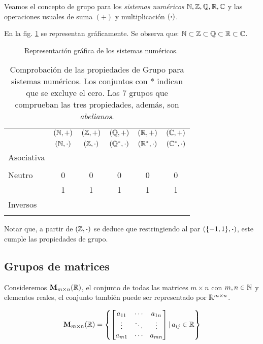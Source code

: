 Veamos el concepto de grupo para los \textit{sistemas numéricos} $\mathbb{N}, \mathbb{Z}, \mathbb{Q}, \mathbb{R}, \mathbb{C}$ y las operaciones usuales de suma $(+)$ y multiplicación $(\boldsymbol{\cdot})$.

En la fig. \ref{fig:sisnum} se representan gráficamente. Se observa que: $\mathbb{N} \subset \mathbb{Z} \subset \mathbb{Q} \subset \mathbb{R} \subset \mathbb{C}$.

\begin{figure}[h]
	\centering
	
	\caption{Representación gráfica de los sistemas numéricos.}
	\label{fig:sisnum}
\end{figure}

\begin{table}[h]
	\centering
	\begin{tabular}{|l|c|c|c|c|c|}
		\hline
		& $(\mathbb{N}, +)$ & $(\mathbb{Z}, +)$ & $(\mathbb{Q}, +)$ & $(\mathbb{R}, +)$ & $(\mathbb{C}, +)$ \\
		& $(\mathbb{N}, \cdot)$ & $(\mathbb{Z}, \cdot)$ & $(\mathbb{Q}^{*}, \cdot)$ & $(\mathbb{R}^{*}, \cdot)$ & $(\mathbb{C}^{*}, \cdot)$ \\ \hline
		Asociativa & \cmark & \cmark & \cmark  & \cmark &  \cmark \\
		& \cmark & \cmark & \cmark  & \cmark  &  \cmark \\ \hline
		Neutro & 0 & 0 & 0  & 0 & 0 \\
		& 1 & 1 & 1  & 1  &  1 \\ \hline
		Inversos & \xmark & \cmark & \cmark  & \cmark & \cmark \\
		& \xmark & \xmark & \cmark  & \cmark & \cmark \\ \hline
	\end{tabular}
	\caption{Comprobación de las propiedades de Grupo para sistemas numéricos. Los conjuntos con $*$ indican que se excluye el cero. Los 7 grupos que comprueban las tres propiedades, además, son \textit{abelianos}.}
\end{table}
Notar que, a partir de $(\mathbb{Z}, \boldsymbol{\cdot})$ se deduce que restringiendo al par $\left(\{ -1, 1 \}, \boldsymbol{\cdot} \right)$, este cumple las propiedades de grupo.


\subsection{Grupos de matrices} \label{sec:matrices}
Consideremos $\mathbf{M}_{m\times n}(\mathbb{R})$, el conjunto de todas las matrices $m \times n$ con $m, n \in \mathbb{N}$ y elementos reales, el conjunto también puede ser representado por $\mathbb{R}^{m \times n}$.

\begin{equation}
	\mathbf{M}_{m \times n}(\mathbb{R}) = \left\{ \begin{bmatrix}
		a_{11} & \cdots & a_{1n}\\
		\vdots & \ddots & \vdots\\
		a_{m1} & \cdots & a_{mn}
	\end{bmatrix} | \, a_{ij} \in \mathbb{R} \right\}
	\label{eq:matrices}
\end{equation}

